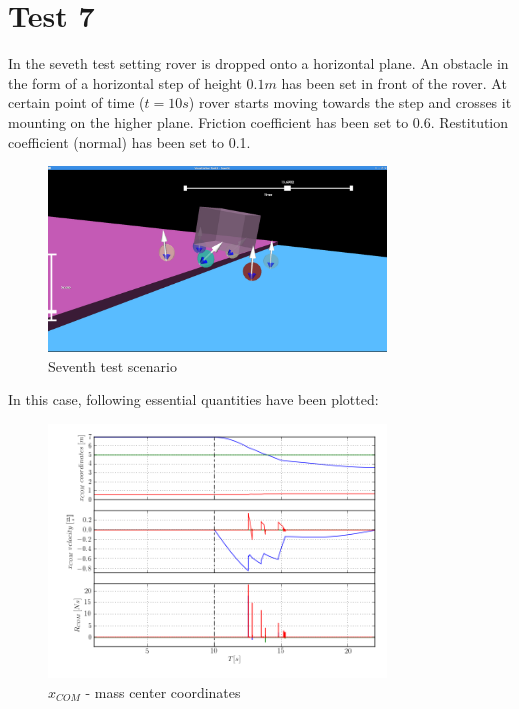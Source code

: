 \newpage
\section{Test 7}
\label{Sec:test_7}

In the seveth test setting rover is dropped onto a horizontal plane.
An obstacle in the form of a horizontal step of height $0.1m$ has been set in front of the rover.
At certain point of time ($t = 10s$) rover starts moving towards the step and crosses it mounting on the higher plane.
Friction coefficient has been set to 0.6. Restitution coefficient (normal) has been set to 0.1. 

\begin{figure}[H]
  \centering
    \includegraphics[width=0.8\textwidth]{run_7}
  \caption{Seventh test scenario}
\end{figure}

\noindent In this case, following essential quantities have been plotted:

\begin{figure}[H]
  \centering
    \includegraphics[width=0.8\textwidth]{xvpCOM7}
  \caption{$x_{COM}$ - mass center coordinates}
\end{figure}


